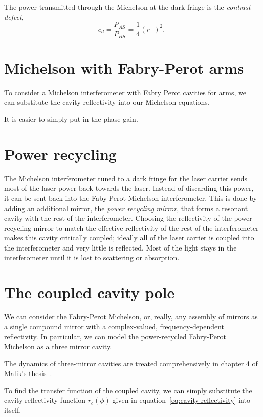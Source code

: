 The power transmitted through the Michelson at the dark fringe is the
\emph{contrast defect},
%
\begin{equation}
c_d = \frac{P_{AS}}{P_{BS}} = \frac{1}{4}\left(r_-\right)^2.
\end{equation}

\section{Michelson with Fabry-Perot arms}

To consider a Michelson interferometer with Fabry Perot cavities for
arms, we can substitute the cavity reflectivity into our Michelson
equations.

It is easier to simply put in the phase gain.

\section{Power recycling}

The Michelson interferometer tuned to a dark fringe for the laser
carrier sends most of the laser power back towards the laser.  Instead
of discarding this power, it can be sent back into the Faby-Perot
Michelson interferometer.  This is done by adding an additional
mirror, the \emph{power recycling mirror}, that forms a resonant
cavity with the rest of the interferometer.  Choosing the reflectivity
of the power recycling mirror to match the effective reflectivity of
the rest of the interferometer makes this cavity critically coupled;
ideally all of the laser carrier is coupled into the interferometer
and very little is reflected.  Most of the light stays in the
interferometer until it is lost to scattering or absorption.

\section{The coupled cavity pole}

We can consider the Fabry-Perot Michelson, or, really, any assembly of
mirrors as a single compound mirror with a complex-valued,
frequency-dependent reflectivity.  In particular, we can model the
power-recycled Fabry-Perot Michelson as a three mirror cavity.

The dynamics of three-mirror cavities are treated comprehensively in
chapter 4 of Malik's thesis~\cite{Rakhmanov2000Dynamics}.

To find the transfer function of the coupled cavity, we can simply
substitute the cavity reflectivity function $r_c(\phi)$ given in
equation~\ref{eq:cavity-reflectivity} into itself.  

